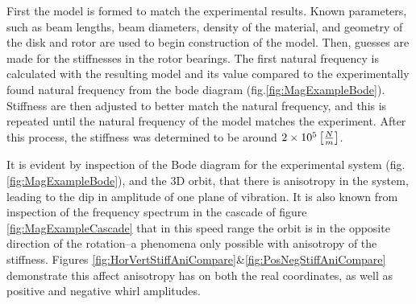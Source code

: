 First the model is formed to match the experimental results. Known parameters, such as beam lengths, beam diameters, density of the material, and geometry of the disk and rotor are used to begin construction of the model. Then, guesses are made for the stiffnesses in the rotor bearings. The first natural frequency is calculated with the resulting model and its value compared to the experimentally found natural frequency from the bode diagram (fig.\ref{fig:MagExampleBode}). Stiffness are then adjusted to better match the natural frequency, and this is repeated until the natural frequency of the model matches the experiment. After this process, the stiffness was determined to be around $ 2\times 10^{5} \left[\frac{N}{m}\right]$.\par
It is evident by inspection of the Bode diagram for the experimental system (fig.\ref{fig:MagExampleBode}), and the 3D orbit, that there is anisotropy in the system, leading to the dip in amplitude of one plane of vibration. It is also known from inspection of the frequency spectrum in the cascade of figure \ref{fig:MagExampleCascade} that in this speed range the orbit is in the opposite direction of the rotation--a phenomena only possible with anisotropy of the stiffness. Figures \ref{fig:HorVertStiffAniCompare}\&\ref{fig:PosNegStiffAniCompare} demonstrate this affect anisotropy has on both the real coordinates, as well as positive and negative whirl amplitudes. \par 
